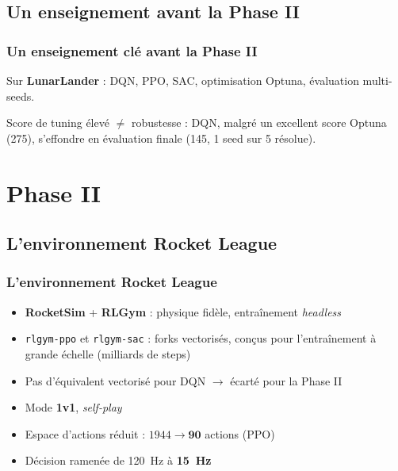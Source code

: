 \documentclass{beamer}
\begin{document}
\subsection{Un enseignement avant la Phase II}
\begin{frame}
\frametitle{Un enseignement clé avant la Phase II}

Sur \textbf{LunarLander} : DQN, PPO, SAC, optimisation Optuna, évaluation
multi-seeds.

\vspace{0.5cm}

\pause

Score de tuning élevé $\neq$ robustesse : DQN, malgré un excellent score
Optuna (275), s'effondre en évaluation finale (145, 1 seed sur 5
résolue).


\end{frame}


\section{Phase II}

\subsection{L'environnement Rocket League}
\begin{frame}
\frametitle{L'environnement Rocket League}

\begin{itemize}
    \item \textbf{RocketSim} + \textbf{RLGym} : physique fidèle,
    entraînement \emph{headless} \nocite{ZealanLRocketSim2022,RLGymRLGym2020}
    \item \texttt{rlgym-ppo} et \texttt{rlgym-sac} : forks vectorisés,
    conçus pour l'entraînement à grande échelle (milliards de steps)
    \nocite{AllenRlgymppo2023,McSwainRlgymsac2026}
    \item Pas d'équivalent vectorisé pour DQN $\rightarrow$ écarté pour
    la Phase II
    \item Mode \textbf{1v1}, \emph{self-play}
    \item Espace d'actions réduit : $1944 \rightarrow \textbf{90}$
    actions (PPO)
    \item Décision ramenée de 120~Hz à \textbf{15~Hz}
\end{itemize}

\end{frame}
\end{document}
